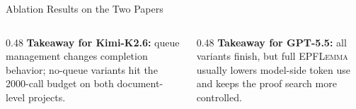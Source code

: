 \documentclass[aspectratio=169,10pt]{beamer}
\newcommand{\method}{\textsc{EPFLemma}\xspace}
\newcommand{\kimi}{Kimi-K2.6\xspace}
\newcommand{\gpt}{GPT-5.5\xspace}
\begin{document}
\begin{frame}[t]{Ablation Results on the Two Papers}
\vspace{3mm}
\begin{columns}[T,onlytextwidth]
  \begin{column}{0.48\textwidth}
    \footnotesize
    \textbf{Takeaway for \kimi:} queue management changes completion behavior;
    no-queue variants hit the 2000-call budget on both document-level projects.
  \end{column}
  \begin{column}{0.48\textwidth}
    \footnotesize
    \textbf{Takeaway for \gpt:} all variants finish, but full \method usually lowers
    model-side token use and keeps the proof search more controlled.
  \end{column}
\end{columns}
\end{frame}
\end{document}

